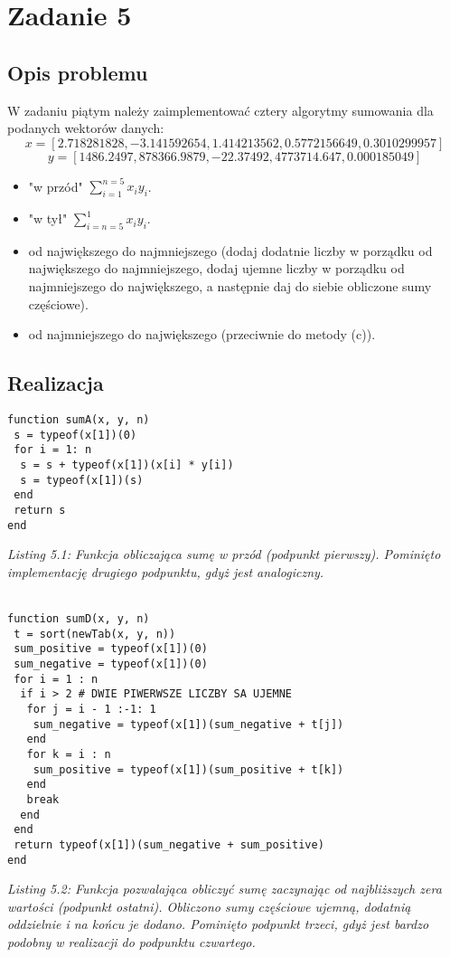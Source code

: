 \documentclass[]{article}
\begin{document}
\section{Zadanie 5}
\subsection{Opis problemu}
W zadaniu piątym należy zaimplementować cztery algorytmy sumowania dla podanych wektorów danych:
\[x = [2.718281828, -3.141592654, 1.414213562, 0.5772156649, 0.3010299957]\]
\[y = [1486.2497, 878366.9879, -22.37492, 4773714.647, 0.000185049]\]
\begin{itemize}
	\item "w przód" \( \sum_{i = 1}^{n = 5}  x_iy_i \).
	\item "w tył" \( \sum_{i = n = 5}^{1}  x_iy_i \).
	\item od największego do najmniejszego (dodaj dodatnie liczby w porządku od największego do najmniejszego, dodaj ujemne liczby w porządku od najmniejszego do największego, a następnie daj do siebie obliczone sumy częściowe).
	\item  od najmniejszego do największego (przeciwnie do metody (c)).
\end{itemize}
\subsection{Realizacja}
\begin{lstlisting}
function sumA(x, y, n)
 s = typeof(x[1])(0)
 for i = 1: n
  s = s + typeof(x[1])(x[i] * y[i])
  s = typeof(x[1])(s)
 end
 return s  
end
\end{lstlisting}
\textit{Listing 5.1: Funkcja obliczająca sumę w przód (podpunkt pierwszy). Pominięto implementację drugiego podpunktu, gdyż jest analogiczny.}
\\\\
\begin{lstlisting}
function sumD(x, y, n)
 t = sort(newTab(x, y, n))
 sum_positive = typeof(x[1])(0)
 sum_negative = typeof(x[1])(0)
 for i = 1 : n
  if i > 2 # DWIE PIWERWSZE LICZBY SA UJEMNE
   for j = i - 1 :-1: 1
    sum_negative = typeof(x[1])(sum_negative + t[j])
   end
   for k = i : n
    sum_positive = typeof(x[1])(sum_positive + t[k])
   end
   break
  end
 end
 return typeof(x[1])(sum_negative + sum_positive)
end
\end{lstlisting}
\textit{Listing 5.2: Funkcja pozwalająca obliczyć sumę zaczynając od najbliższych zera wartości (podpunkt ostatni). Obliczono sumy częściowe ujemną, dodatnią oddzielnie i na końcu je dodano. Pominięto podpunkt trzeci, gdyż jest bardzo podobny w realizacji do podpunktu czwartego.}
\end{document}
